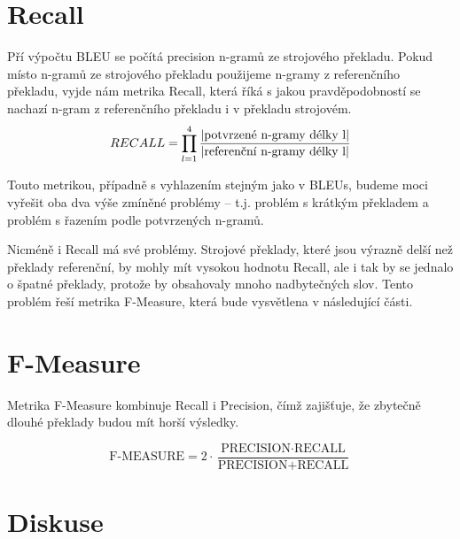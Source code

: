 \section{Recall}
Pří výpočtu BLEU se počítá precision \mbox{n-gramů} ze strojového překladu.
Pokud místo \mbox{n-gramů} ze strojového překladu použijeme \mbox{n-gramy} z referenčního překladu,
  vyjde nám metrika Recall,
  která říká s jakou pravděpodobností se nachazí \mbox{n-gram} z referenčního překladu i v překladu strojovém.
$$ RECALL = \prod_{l=1}^{4} \frac{ \lvert \text{potvrzené \mbox{n-gramy} délky l} \rvert }{ \lvert \text{referenční \mbox{n-gramy} délky l} \rvert } $$

Touto metrikou, případně s vyhlazením stejným jako v BLEUs,
  budeme moci vyřešit oba dva výše zmíněné problémy -- 
  t.j. problém s krátkým překladem a problém s řazením podle potvrzených \mbox{n-gramů}.

Nicméně i Recall má své problémy.
Strojové překlady,
  které jsou výrazně delší než překlady referenční,
  by mohly mít vysokou hodnotu Recall,
  ale i tak by se jednalo o špatné překlady,
  protože by obsahovaly mnoho nadbytečných slov. 
Tento problém řeší metrika F-Measure,
  která bude vysvětlena v následující části.

\section{F-Measure}
Metrika F-Measure kombinuje Recall i Precision,
  čímž zajišťuje, 
  že zbytečně dlouhé překlady budou mít horší výsledky.

$$ \text{F-MEASURE} = 2 \cdot \frac{\text{PRECISION} \cdot \text{RECALL}}{\text{PRECISION} + \text{RECALL}} $$

\section{Diskuse}
